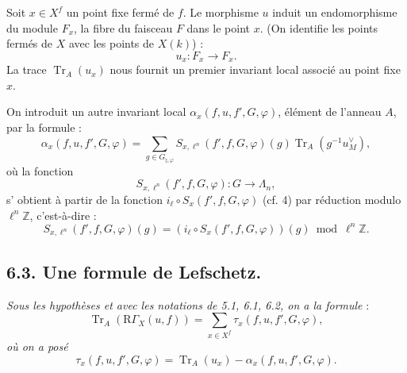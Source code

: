 \documentclass[11pt]{article}
\newcommand{\R}{\mathrm{R}}\newcommand{\RHomCore}{\mathrm{RHom}}
\providecommand{\Tr}{\operatorname{Tr}}
\providecommand{\Tr}{\operatorname{Tr}}
\providecommand{\Tr}{\operatorname{Tr}}
\providecommand{\R}{\mathrm R}
\providecommand{\Tr}{\operatorname{Tr}}
\providecommand{\RG}{\R\Gamma}
\providecommand{\La}{\Lambda}
\providecommand{\bZ}{\mathbb Z}
\providecommand{\Tr}{\operatorname{Tr}}
\begin{document}
Soit $x\in X^f$ un point fixe fermé de $f$. Le morphisme $u$ induit un endomorphisme du module $F_x$, la fibre du faisceau $F$ dans le point $x$. (On identifie les points fermés de $X$ avec les points de $X(k)$) :
\[
u_x:F_x\longrightarrow F_x .
\]
La trace $\Tr_A(u_x)$ nous fournit un premier invariant local associé au point fixe $x$.

On introduit un autre invariant local $\alpha_x(f,u,f',G,\varphi)$, élément de l'anneau $A$, par la formule :
\begin{equation}\tag{6.2.2}
\alpha_x(f,u,f',G,\varphi)=
\sum_{g\in G_{\natural,\varphi}}
S_{x,\ell^n}(f',f,G,\varphi)(g)\Tr_A(g^{-1}u_M^\vee),
\end{equation}
où la fonction
\[
S_{x,\ell^n}(f',f,G,\varphi):G\longrightarrow\La_n,
\]
s'%
obtient à partir de la fonction $i_\ell\circ S_x(f',f,G,\varphi)$ (cf. 4) par réduction modulo $\ell^n\bZ$, c'est-à-dire :%
\[
S_{x,\ell^n}(f',f,G,\varphi)(g)=
(i_\ell\circ S_x(f',f,G,\varphi))(g)\bmod \ell^n\bZ.
\]

\subsection*{6.3. Une formule de Lefschetz.}
\emph{Sous les hypothèses et avec les notations de 5.1, 6.1, 6.2, on a la formule} :
\begin{equation}
\tag{6.3.1}
\Tr_A(\RG_X(u,f))=\sum_{x\in X^f}\tau_x(f,u,f',G,\varphi),
\end{equation}
\emph{où on a posé}
\begin{equation}
\tag{6.3.2}
\tau_x(f,u,f',G,\varphi)=\Tr_A(u_x)-\alpha_x(f,u,f',G,\varphi).
\end{equation}
\end{document}
